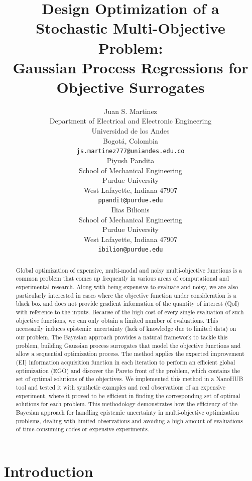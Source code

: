 \documentclass{article}
\title{Design Optimization of a Stochastic Multi-Objective Problem: \\Gaussian Process Regressions for Objective Surrogates}
\author{
  Juan S. Martinez\\
  Department of Electrical and Electronic Engineering\\
  Universidad de los Andes\\
  Bogotá, Colombia \\
  \texttt{js.martinez777@uniandes.edu.co} \\
  \And
  Piyush Pandita \\
  School of Mechanical Engineering \\
  Purdue University \\
  West Lafayette, Indiana 47907\\
  \texttt{ppandit@purdue.edu} \\
  \AND
  Ilias Bilionis \\
  School of Mechanical Engineering \\
  Purdue University \\
  West Lafayette, Indiana 47907\\
  \texttt{ibilion@purdue.edu} \\
}
\begin{document}

\maketitle

\begin{abstract}
    Global optimization of expensive, multi-modal and noisy multi-objective functions is a common problem that comes up frequently in various areas of computational and experimental research. Along with being expensive to evaluate and noisy, we are also particularly interested in cases where the objective function under consideration is a black box and does not provide gradient information of the quantity of interest (QoI) with reference to the inputs. Because of the high cost of every single evaluation of such objective functions, we can only obtain a limited number of evaluations. This necessarily induces epistemic uncertainty (lack of knowledge due to limited data) on our problem. The Bayesian approach provides a natural framework to tackle this problem, building Gaussian process surrogates that model the objective functions and allow a sequential optimization process. The method applies the expected improvement (EI) information acquisition function in each iteration to perform an efficient global optimization (EGO) and discover the Pareto front of the problem, which contains the set of optimal solutions of the objectives. We implemented this method in a NanoHUB tool and tested it with synthetic examples and real observations of an expensive experiment, where it proved to be efficient in finding the corresponding set of optimal solutions for each problem. This methodology demonstrates how the efficiency of the Bayesian approach for handling epistemic uncertainty in multi-objective optimization problems, dealing with limited observations and avoiding a high amount of evaluations of time-consuming codes or expensive experiments.
\end{abstract}

\section{Introduction}
\end{document}
